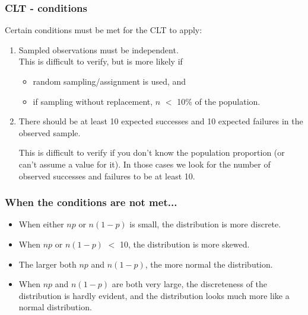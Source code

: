 \documentclass[t,compress,mathserif]{beamer}
\begin{document}
\begin{frame}
\frametitle{CLT - conditions}

Certain conditions must be met for the CLT to apply:

\begin{enumerate}

\item {} Sampled observations must be independent. \\

This is difficult to verify, but is more likely if
\begin{itemize}
\item random sampling/assignment is used, and
\item if sampling without replacement, $n$ $<$ 10\% of the population.
\end{itemize}

\pause

\item {} There should be at least 10 expected successes and 10 expected failures in the observed sample.

This is difficult to verify if you don't know the population proportion (or can't assume a value for it). In those cases we look for the number of observed successes and failures to be at least 10.

\end{enumerate}

\end{frame}


\begin{frame}
\frametitle{When the conditions are not met...}

\begin{itemize}

\item When either $np$ or $n(1-p)$ is small, the distribution is more discrete.
\item When $np$ or $n(1-p)$ $<$ 10, the distribution is more skewed.
\item The larger both $np$ and $n(1-p)$, the more normal the distribution.
\item When $np$ and $n(1-p)$ are both very large, the discreteness of the distribution is hardly evident, and the distribution looks much more like a normal distribution.

\end{itemize}

\end{frame}
\end{document}
